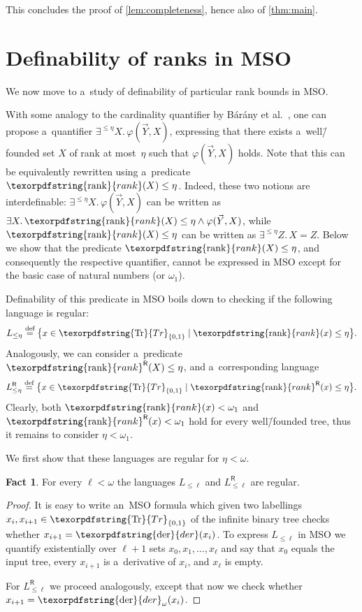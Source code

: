 \documentclass[11pt,a4paper]{amsart}
\theoremstyle{plain}
\theoremstyle{definition}
\newtheorem{fact}[thm]{Fact}
\theoremstyle{defC}
\theoremstyle{thmC}
\theoremstyle{plain}
\numberwithin{equation}{section}
\numberwithin{equation}{section}
\numberwithin{figure}{section}
\newcommand{\ident}[1]{\ensuremath{\texorpdfstring{\mathrm{\mathnm{#1}}}{#1}}\xspace}
\newcommand{\eqdef}{\stackrel{\text{def}}=}
\newcommand{\mathnm}[1]{#1}
\newcommand{\trees}{\ident{Tr}}
\newcommand{\der}{\ident{der}}
\newcommand{\sR}{\mathsf{R}}
\newcommand{\rank}{\ident{rank}}
\newcommand{\rankR}{\ident{rank}^\sR}
\renewcommand\phi\varphi
\newcommand{\derF}{\der_\omega}
\begin{document}
This concludes the proof of \cref{lem:completeness}, hence also of \cref{thm:main}.



\section{Definability of ranks in MSO}
\label{sec:definability}

We now move to a~study of definability of particular rank bounds in MSO.

With some analogy to the cardinality quantifier by B\'ar\'any et al.~\cite{barany_expressing_trees},
one can propose a~quantifier $\exists^{\leq \eta} X.\,\phi(\vec{Y},X)$, expressing that there exists a~well\=/founded set $X$ of rank at most~$\eta$ such that $\phi(\vec{Y},X)$ holds.
Note that this can be equivalently rewritten using a~predicate $\rank(X)\leq \eta$.
Indeed, these two notions are interdefinable: $\exists^{\leq \eta} X.\,\phi(\vec{Y},X)$ can be written as $\exists X.\,\rank(X)\leq \eta\land\phi(\vec{Y},X)$,
while $\rank(X)\leq \eta$ can be written as $\exists^{\leq \eta} Z.\,X=Z$.
Below we show that the predicate $\rank(X)\leq \eta$, and consequently the respective quantifier, cannot be expressed in MSO except for the basic case of natural numbers (or $\omega_1$).

Definability of this predicate in MSO boils down to checking if the following language is regular:
\[L_{\leq\eta}\eqdef \big\{x\in\trees_{\{0,1\}}\mid \rank(x)\leq \eta\big\}.\]
Analogously, we can consider a~predicate $\rankR(X)\leq \eta$, and a~corresponding language
\[L^{\sR}_{\leq\eta}\eqdef \big\{x\in\trees_{\{0,1\}}\mid \rankR(x)\leq \eta\big\}.\]
Clearly, both $\rank(x)<\omega_1$ and $\rankR(x)<\omega_1$ hold for every well\=/founded tree, thus it remains to consider $\eta<\omega_1$.

We first show that these languages are regular for $\eta<\omega$.

\begin{fact}\label{ft:rank-definable}
	For every $\ell<\omega$ the languages $L_{\leq\ell}$ and $L^{\sR}_{\leq\ell}$ are regular.
\end{fact}

\begin{proof}
	It is easy to write an~MSO formula which given two labellings $x_i,x_{i+1}\in\trees_{\{0,1\}}$ of the infinite binary tree checks whether $x_{i+1}=\der(x_i)$.
	To express $L_{\leq\ell}$ in MSO we quantify existentially over $\ell+1$ sets $x_0,x_1,\dots,x_\ell$ and say that $x_0$ equals the input tree,
	every $x_{i+1}$ is a~derivative of $x_i$, and $x_\ell$ is empty.
	
	For $L^{\sR}_{\leq\ell}$ we proceed analogously, except that now we check whether $x_{i+1}=\derF(x_i)$.
\end{proof}
\end{document}

